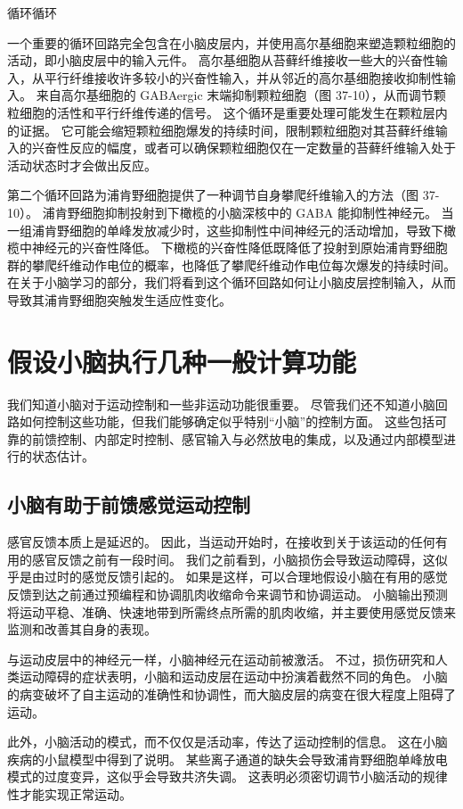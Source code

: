 循环循环

一个重要的循环回路完全包含在小脑皮层内，并使用高尔基细胞来塑造颗粒细胞的活动，即小脑皮层中的输入元件。 高尔基细胞从苔藓纤维接收一些大的兴奋性输入，从平行纤维接收许多较小的兴奋性输入，并从邻近的高尔基细胞接收抑制性输入。 来自高尔基细胞的 GABAergic 末端抑制颗粒细胞（图 37-10），从而调节颗粒细胞的活性和平行纤维传递的信号。 这个循环是重要处理可能发生在颗粒层内的证据。 它可能会缩短颗粒细胞爆发的持续时间，限制颗粒细胞对其苔藓纤维输入的兴奋性反应的幅度，或者可以确保颗粒细胞仅在一定数量的苔藓纤维输入处于活动状态时才会做出反应。

第二个循环回路为浦肯野细胞提供了一种调节自身攀爬纤维输入的方法（图 37-10）。 浦肯野细胞抑制投射到下橄榄的小脑深核中的 GABA 能抑制性神经元。 当一组浦肯野细胞的单峰发放减少时，这些抑制性中间神经元的活动增加，导致下橄榄中神经元的兴奋性降低。 下橄榄的兴奋性降低既降低了投射到原始浦肯野细胞群的攀爬纤维动作电位的概率，也降低了攀爬纤维动作电位每次爆发的持续时间。 在关于小脑学习的部分，我们将看到这个循环回路如何让小脑皮层控制输入，从而导致其浦肯野细胞突触发生适应性变化。


\section{假设小脑执行几种一般计算功能}
我们知道小脑对于运动控制和一些非运动功能很重要。 尽管我们还不知道小脑回路如何控制这些功能，但我们能够确定似乎特别“小脑”的控制方面。 这些包括可靠的前馈控制、内部定时控制、感官输入与必然放电的集成，以及通过内部模型进行的状态估计。

\subsection{小脑有助于前馈感觉运动控制}
感官反馈本质上是延迟的。 因此，当运动开始时，在接收到关于该运动的任何有用的感官反馈之前有一段时间。 我们之前看到，小脑损伤会导致运动障碍，这似乎是由过时的感觉反馈引起的。 如果是这样，可以合理地假设小脑在有用的感觉反馈到达之前通过预编程和协调肌肉收缩命令来调节和协调运动。 小脑输出预测将运动平稳、准确、快速地带到所需终点所需的肌肉收缩，并主要使用感觉反馈来监测和改善其自身的表现。

与运动皮层中的神经元一样，小脑神经元在运动前被激活。 不过，损伤研究和人类运动障碍的症状表明，小脑和运动皮层在运动中扮演着截然不同的角色。 小脑的病变破坏了自主运动的准确性和协调性，而大脑皮层的病变在很大程度上阻碍了运动。

此外，小脑活动的模式，而不仅仅是活动率，传达了运动控制的信息。 这在小脑疾病的小鼠模型中得到了说明。 某些离子通道的缺失会导致浦肯野细胞单峰放电模式的过度变异，这似乎会导致共济失调。 这表明必须密切调节小脑活动的规律性才能实现正常运动。

